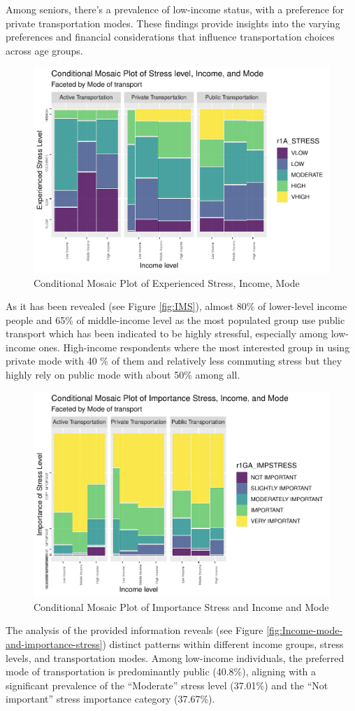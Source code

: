 \documentclass[
11pt, %
oneside, %
english, %
singlespacing, %
]{macthesis} %
\begin{document}
Among seniors, there's a prevalence of low-income status, with a preference for private transportation modes. These findings provide insights into the varying preferences and financial considerations that influence transportation choices across age groups.
\begin{figure}
\includegraphics[width=0.85\linewidth]{thesis_files/figure-latex/unnamed-chunk-29-1} \caption{\label{fig:IMS}Conditional Mosaic Plot of Experienced Stress, Income, Mode}\label{fig:unnamed-chunk-29}
\end{figure}
As it has been revealed (see Figure \ref{fig:IMS}), almost 80\% of lower-level income people and 65\% of middle-income level as the most populated group use public transport which has been indicated to be highly stressful, especially among low-income ones. High-income respondents where the most interested group in using private mode with 40 \% of them and relatively less commuting stress but they highly rely on public mode with about 50\% among all.
\begin{figure}
\includegraphics[width=0.85\linewidth]{thesis_files/figure-latex/unnamed-chunk-30-1} \caption{\label{fig:Income-mode-and-importance-stress}Conditional Mosaic Plot of Importance Stress and Income and Mode}\label{fig:unnamed-chunk-30}
\end{figure}
The analysis of the provided information reveals (see Figure \ref{fig:Income-mode-and-importance-stress}) distinct patterns within different income groups, stress levels, and transportation modes. Among low-income individuals, the preferred mode of transportation is predominantly public (40.8\%), aligning with a significant prevalence of the ``Moderate'' stress level (37.01\%) and the ``Not important'' stress importance category (37.67\%).
\end{document}
